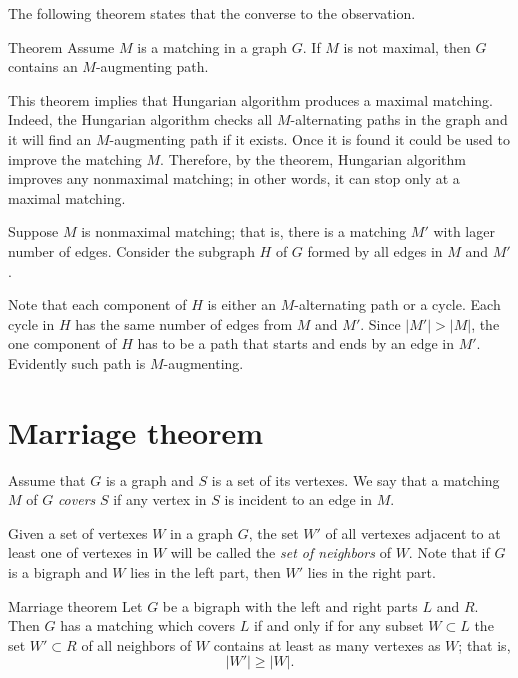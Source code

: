 The following theorem states that the converse to the observation.

\begin{thm}{Theorem}
Assume $M$ is a matching in a graph $G$.
If $M$ is not maximal, then $G$ contains an $M$-augmenting path.
\end{thm}

This theorem implies that Hungarian algorithm \cite[Section 7.2]{hartsfield-ringel} produces a maximal matching.
Indeed, the Hungarian algorithm checks all $M$-alternating paths in the graph and it will find an $M$-augmenting path if it exists.
Once it is found it could be used to improve the matching $M$.
Therefore, by the theorem, Hungarian algorithm improves any nonmaximal matching;
in other words, it can stop only at a maximal matching.

Suppose $M$ is nonmaximal matching; that is, there is a matching $M'$ with lager number of edges.
Consider the subgraph $H$ of $G$ formed by all edges in $M$ and $M'$.

Note that each component of $H$ is either an $M$-alternating path or a cycle.
Each cycle in $H$ has the same number of edges from $M$ and $M'$.
Since $|M'|>|M|$, the one component of $H$ has to be a path that starts and ends by an edge in $M'$.
Evidently such path is $M$-augmenting.
\qeds

\section*{Marriage theorem}

Assume that $G$ is a graph and $S$ is a set of its vertexes.
We say that a matching $M$ of $G$ {}\emph{covers} $S$ if any vertex in $S$ is incident to an edge in $M$.

Given a set of vertexes $W$ in a graph $G$, the set $W'$ of all vertexes  adjacent to at least one of vertexes in $W$ will be called the \emph{set of neighbors} of $W$.
Note that if $G$ is a bigraph and $W$ lies in the left part, then $W'$ lies in the right part. 

\begin{thm}{Marriage theorem}
Let $G$ be a bigraph with the left and right parts $L$ and $R$.
Then $G$ has a matching which covers $L$ if and only if for any subset $W\subset L$ the set $W'\subset R$ of all neighbors of $W$ contains at least as many vertexes as $W$; that is, 
\[|W'|\ge |W|.\] 

\end{thm}

